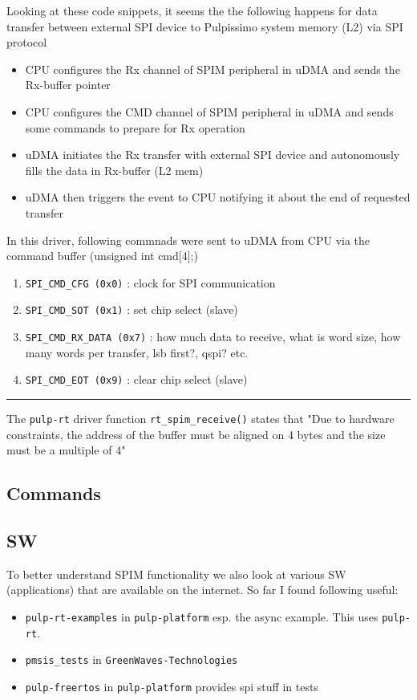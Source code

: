 \documentclass{article}
\begin{document}
%
Looking at these code snippets, it seems the the following happens for data transfer between external SPI device
to Pulpissimo system memory (L2) via SPI protocol
\begin{itemize}
 \item CPU configures the Rx channel of SPIM peripheral in uDMA and sends the Rx-buffer pointer
 \item CPU configures the CMD channel of SPIM peripheral in uDMA and sends some commands to prepare for Rx operation
 \item uDMA initiates the Rx transfer with external SPI device and autonomously fills the data in Rx-buffer (L2 mem)
 \item uDMA then triggers the event to CPU notifying it about the end of requested transfer
\end{itemize}
In this driver, following commnads were sent to uDMA from CPU via the command buffer (unsigned int cmd[4];)
\begin{enumerate}
 \item \texttt{SPI\_CMD\_CFG (0x0)} : clock for SPI communication
 \item \texttt{SPI\_CMD\_SOT (0x1)} : set chip select (slave)
 \item \texttt{SPI\_CMD\_RX\_DATA (0x7)} : how much data to receive, what is word size, how many words per transfer,
       lsb first?, qspi? etc.
 \item \texttt{SPI\_CMD\_EOT (0x9)} : clear chip select (slave)
\end{enumerate}
%
\noindent \rule[0.5ex]{\linewidth}{1pt}

The \texttt{pulp-rt} driver function \texttt{rt\_spim\_receive()} states that "Due to hardware constraints, the address
of the buffer must be aligned on 4 bytes and the size must be a multiple of 4"

\subsection{Commands}

\subsection{SW}
To better understand SPIM functionality we also look at various SW (applications) that are available on the internet.
So far I found following useful:
\begin{itemize}
 \item \texttt{pulp-rt-examples} in \texttt{pulp-platform} esp. the async example. This uses \texttt{pulp-rt}.
 \item  \texttt{pmsis\_tests} in \texttt{GreenWaves-Technologies}
 \item \texttt{pulp-freertos} in \texttt{pulp-platform} provides spi stuff in tests
\end{itemize}
\end{document}
